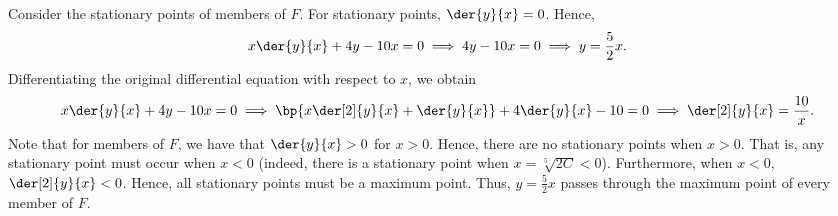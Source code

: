 \begin{solution}
    Consider the stationary points of members of $F$. For stationary points, $\der{y}{x} = 0$. Hence, \[x\der{y}{x} + 4y - 10x = 0 \implies 4y - 10 x = 0 \implies y = \frac52 x.\] Differentiating the original differential equation with respect to $x$, we obtain \[x\der{y}{x} + 4y - 10x = 0 \implies \bp{x \der[2]{y}{x} + \der{y}{x}} + 4\der{y}{x} - 10 = 0 \implies \der[2]{y}{x} = \frac{10}{x}.\]
    Note that for members of $F$, we have that $\der{y}{x} > 0$ for $x > 0$. Hence, there are no stationary points when $x > 0$. That is, any stationary point must occur when $x < 0$ (indeed, there is a stationary point when $x = \sqrt[5]{2C} < 0$). Furthermore, when $x < 0$, $\der[2]{y}{x} < 0$. Hence, all stationary points must be a maximum point. Thus, $y = \frac52 x$ passes through the maximum point of every member of $F$.
\end{solution}

